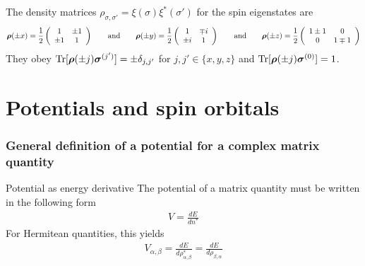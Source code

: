 \documentclass[11pt,a4paper]{report}
\begin{document}
The density matrices
$\rho_{\sigma,\sigma'}=\xi(\sigma)\xi^*(\sigma')$ for the spin
eigenstates 
are
\begin{eqnarray*}
\bm{\rho}(\pm x)=\frac{1}{2}\left(\begin{array}{cc}1&\pm1\\\pm1&1\end{array}\right)
\qquad\text{and}\qquad
\bm{\rho}(\pm y)=\frac{1}{2}\left(\begin{array}{cc}1&\mp i\\\pm i&1\end{array}\right)
\qquad\text{and}\qquad
\bm{\rho}(\pm z)=\frac{1}{2}\left(\begin{array}{cc}1\pm1& 0\\0&1\mp1\end{array}\right)
\end{eqnarray*}
They obey $\mathrm{Tr}[\bm{\rho}(\pm
  j)\bm{\sigma}^{(j')}]=\pm\delta_{j,j'}$ for $j,j'\in\{x,y,z\}$ and 
$\mathrm{Tr}[\bm{\rho}(\pm j)\bm{\sigma}^{(0)}]=1$.






\section{Potentials and spin orbitals}

\subsubsection{General definition of a potential for a complex matrix quantity}
\begin{myshadowminipage}{Potential as energy derivative}
The potential of a matrix quantity must be written in the following
form
\begin{eqnarray*}
V=\frac{dE}{dn^*}
\end{eqnarray*}
For Hermitean quantities, this yields 
\begin{eqnarray*}
V_{\alpha,\beta}=\frac{dE}{d\rho_{\alpha,\beta}^*}=\frac{dE}{d\rho_{\beta,\alpha}}
\end{eqnarray*}
\end{myshadowminipage}
\end{document}
